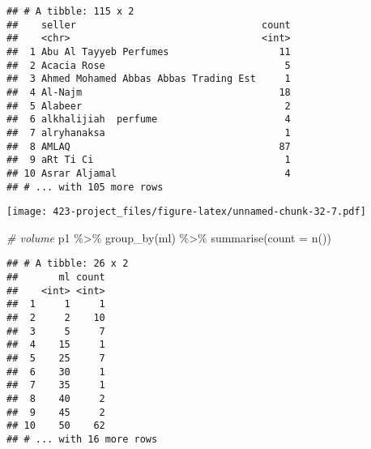\documentclass[
]{article}
\newenvironment{Shaded}{\begin{snugshade}}{\end{snugshade}}
\newcommand{\AttributeTok}[1]{\textcolor[rgb]{0.77,0.63,0.00}{#1}}
\newcommand{\CommentTok}[1]{\textcolor[rgb]{0.56,0.35,0.01}{\textit{#1}}}
\newcommand{\FunctionTok}[1]{\textcolor[rgb]{0.00,0.00,0.00}{#1}}
\newcommand{\NormalTok}[1]{#1}
\newcommand{\OtherTok}[1]{\textcolor[rgb]{0.56,0.35,0.01}{#1}}
\newcommand{\SpecialCharTok}[1]{\textcolor[rgb]{0.00,0.00,0.00}{#1}}
\newcommand{\StringTok}[1]{\textcolor[rgb]{0.31,0.60,0.02}{#1}}
\begin{document}
\begin{verbatim}
## # A tibble: 115 x 2
##    seller                                count
##    <chr>                                 <int>
##  1 Abu Al Tayyeb Perfumes                   11
##  2 Acacia Rose                               5
##  3 Ahmed Mohamed Abbas Abbas Trading Est     1
##  4 Al-Najm                                  18
##  5 Alabeer                                   2
##  6 alkhalijiah  perfume                      4
##  7 alryhanaksa                               1
##  8 AMLAQ                                    87
##  9 aRt Ti Ci                                 1
## 10 Asrar Aljamal                             4
## # ... with 105 more rows
\end{verbatim}

\begin{Shaded}
\end{Shaded}

\texttt{[image: 423-project\_files/figure-latex/unnamed-chunk-32-7.pdf]}

\begin{Shaded}
\begin{Highlighting}[]
\CommentTok{\# volume}
\NormalTok{p1 }\SpecialCharTok{\%\textgreater{}\%}
  \FunctionTok{group\_by}\NormalTok{(ml) }\SpecialCharTok{\%\textgreater{}\%}
  \FunctionTok{summarise}\NormalTok{(}\AttributeTok{count =} \FunctionTok{n}\NormalTok{())}
\end{Highlighting}
\end{Shaded}

\begin{verbatim}
## # A tibble: 26 x 2
##       ml count
##    <int> <int>
##  1     1     1
##  2     2    10
##  3     5     7
##  4    15     1
##  5    25     7
##  6    30     1
##  7    35     1
##  8    40     2
##  9    45     2
## 10    50    62
## # ... with 16 more rows
\end{verbatim}
\end{document}
